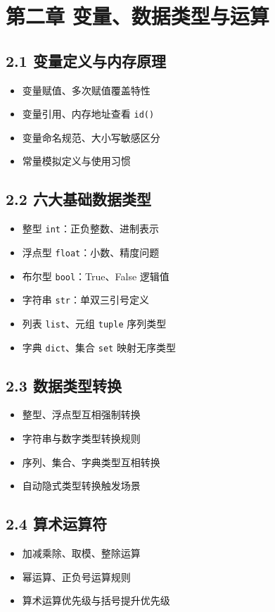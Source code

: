 \section{第二章 变量、数据类型与运算}
\subsection{2.1 变量定义与内存原理}
\begin{itemize}
\item 变量赋值、多次赋值覆盖特性
\item 变量引用、内存地址查看 \texttt{id()}
\item 变量命名规范、大小写敏感区分
\item 常量模拟定义与使用习惯
\end{itemize}

\subsection{2.2 六大基础数据类型}
\begin{itemize}
\item 整型 \texttt{int}：正负整数、进制表示
\item 浮点型 \texttt{float}：小数、精度问题
\item 布尔型 \texttt{bool}：True、False 逻辑值
\item 字符串 \texttt{str}：单双三引号定义
\item 列表 \texttt{list}、元组 \texttt{tuple} 序列类型
\item 字典 \texttt{dict}、集合 \texttt{set} 映射无序类型
\end{itemize}

\subsection{2.3 数据类型转换}
\begin{itemize}
\item 整型、浮点型互相强制转换
\item 字符串与数字类型转换规则
\item 序列、集合、字典类型互相转换
\item 自动隐式类型转换触发场景
\end{itemize}

\subsection{2.4 算术运算符}
\begin{itemize}
\item 加减乘除、取模、整除运算
\item 幂运算、正负号运算规则
\item 算术运算优先级与括号提升优先级
\end{itemize}

